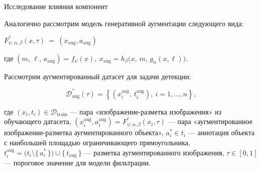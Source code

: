 \documentclass{beamer}
\begin{document}
\begin{frame}{Исследование влияния компонент}

\small{Аналогично рассмотрим модель генеративной аугментации следующего вида:
\begin{center}
$F^{''}_{\psi,\alpha,\beta}(x, \tau) \ = \ (x_{\text{aug}}, a_{\text{aug}})$
\end{center}
где 
$ 
(m,\,\ell,\, a_{\text{aug}}) = f_{\psi}(x),  \ x_{\text{aug}} = h_{\beta}\bigl(x,\,m,\,g_{\alpha}(x, \ell)\bigr)$.

\begin{center}
Рассмотрим аугментированный датасет для задачи детекции:
\end{center}
\[
\mathcal{D}^{''}_{\text{aug}}(\tau) =
\left\{
  (x_i^{\text{aug}},\,t_i^{\text{aug}}), \
  i = 1,\dots,n
\right\},
\]

где $(x_i, t_i) \in \mathcal{D}_{\mathrm{train}}$ — пара «изображение-разметка изображения» из обучающего датасета,
$(x_i^{\mathrm{aug}}, a_i^{\mathrm{aug}}) = F^{''}_{\psi,\alpha,\beta}(x_i, \tau)$ — пара «аугментированное изображение-разметка аугментированного объекта»,
$a_i^* \in t_i$ — аннотация объекта с наибольшей площадью ограничивающего прямоугольника,
$t_i^{\mathrm{aug}} = \bigl(t_i \setminus \{\,a_i^*\,\}\bigr) \cup \{\,t_{\mathrm{aug}}\,\}$ — разметка аугментированного изображения,
$\tau \in [0,1]$ — пороговое значение для модели фильтрации.}


\end{frame}
\end{document}
